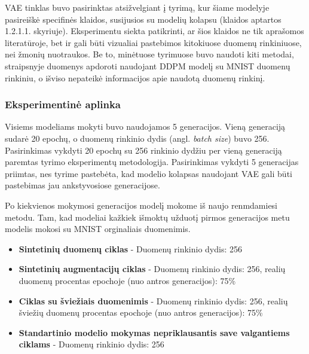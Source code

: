 \documentclass{VUMIFInfKursinis}
\begin{document}
VAE tinklas buvo pasirinktas atsižvelgiant į \cite{AICollapseNature} tyrimą, kur šiame modelyje pasireiškė specifinės klaidos, susijusios su modelių kolapsu (klaidos aptartos 1.2.1.1. skyriuje). Eksperimentu siekta patikrinti, ar šios klaidos ne tik aprašomos literatūroje, bet ir gali būti vizualiai pastebimos kitokiuose duomenų rinkiniuose, nei žmonių nuotraukos. Be to, minėtuose tyrimuose buvo naudoti kiti metodai, \cite{ModelsGoMAD} straipsnyje duomenys apdoroti naudojant DDPM modelį su MNIST duomenų rinkiniu, o \cite{AICollapseNature} išviso nepateikė informacijos apie naudotą duomenų rinkinį.

\subsubsection{Eksperimentinė aplinka}

Visiems modeliams mokyti buvo naudojamos 5 generacijos. Vieną generaciją sudarė 20 epochų, o duomenų rinkinio dydis (angl. \textsl{batch size}) buvo 256. Pasirinkimas vykdyti 20 epochų su 256 rinkinio dydžiu per vieną generaciją paremtas \cite{ModelsGoMAD} tyrimo eksperimentų metodologija. Pasirinkimas vykdyti 5 generacijas priimtas, nes tyrime \cite{AICollapseNature} pastebėta, kad modelio kolapsas naudojant VAE gali būti pastebimas jau ankstyvosiose generacijose.

Po kiekvienos mokymosi generacijos modelį mokome iš naujo renmdamiesi \cite{ModelsGoMAD} metodu. Tam, kad modeliai kažkiek išmoktų užduotį pirmos generacijos metu modelis mokosi su MNIST orginaliais duomenimis. 


\begin{itemize}
    \item \textbf{Sintetinių duomenų ciklas} -
    Duomenų rinkinio dydis: 256 
    \item \textbf{Sintetinių augmentacijų ciklas} -
    Duomenų rinkinio dydis: 256, realių duomenų procentas epochoje (nuo antros generacijos): 75\%
    \item \textbf{Ciklas su šviežiais duomenimis} -
    Duomenų rinkinio dydis: 256, realių šviežių duomenų procentas epochoje (nuo antros generacijos): 75\%
    \item \textbf{Standartinio modelio mokymas nepriklausantis save valgantiems ciklams} -
    Duomenų rinkinio dydis: 256
\end{itemize}
\end{document}
